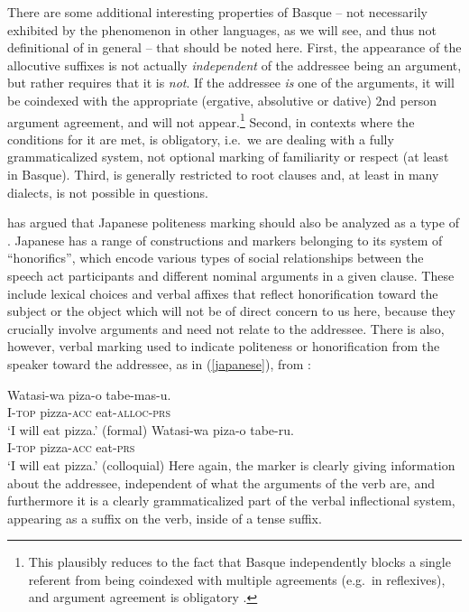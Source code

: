 \documentclass[output=paper, modfonts, nonflat]{langsci/langscibook}
\begin{document}
There are some additional interesting properties of Basque \allagr{}
-- not necessarily exhibited by the phenomenon in other languages, as
we will see, and thus not definitional of \allagr{} in general --
that should be noted here. First, the appearance of the allocutive
suffixes is not actually \emph{independent} of the addressee being an
argument, but rather requires that it is \emph{not}. If the addressee
\emph{is} one of the arguments, it will be coindexed with the
appropriate (ergative, absolutive or dative) 2nd person argument
agreement, and \allagr{} will not appear.\footnote{This plausibly
  reduces to the fact that Basque independently blocks a single
  referent from being coindexed with multiple agreements (e.g.\ in
  reflexives), and argument agreement is obligatory
  \citep{antonov:2015}.} Second, in contexts where the conditions for
it are met, \allagr{} is obligatory, i.e.\ we are dealing with a fully
grammaticalized system, not optional marking of familiarity or respect
(at least in Basque). Third, \allagr{} is generally restricted to root
clauses and, at least in many dialects, is not possible in questions.

\citet{miyagawa:2017} has argued that Japanese politeness marking
should also be analyzed as a type of \allagr{}. Japanese has a range
of constructions and markers belonging to its system of ``honorifics'',
which encode various types of social relationships between the speech
act participants and different nominal arguments in a given
clause. These include lexical choices and verbal affixes that reflect
honorification toward the subject or the object which will not be of
direct concern to us here, because they crucially involve arguments
and need not relate to the addressee. There is also, however, verbal
marking used to indicate politeness or honorification from the speaker
toward the addressee, as in (\ref{japanese}), from\largerpage
\citet{miyagawa:2017}:

\ea\label{japanese}
  \ea\label{fjap}\gll Watasi-wa piza-o tabe-mas-u.\\
  I-\textsc{top} pizza-\textsc{acc}{} eat-\textsc{alloc}-\textsc{prs}\\
  \glt `I will eat pizza.' (formal)
  \ex\label{cjap}\gll Watasi-wa piza-o tabe-ru.\\
  I-\textsc{top} pizza-\textsc{acc}{} eat-\textsc{prs}\\
  \glt `I will eat pizza.' (colloquial)
  \z
\z
%
Here again, the marker is clearly giving information about the
addressee, independent of what the arguments of the verb are, and
furthermore it is a clearly grammaticalized part of the verbal
inflectional system, appearing as a suffix on the verb, inside of a
tense suffix. 
\end{document}
